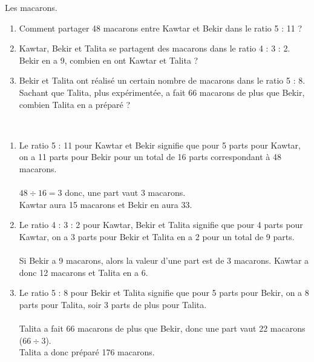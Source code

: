\begin{exercice*}
   Les macarons.
   \begin{enumerate}
      \item Comment partager 48 macarons entre Kawtar et Bekir dans le ratio 5 : 11 ?
      \item Kawtar, Bekir et Talita se partagent des macarons dans le ratio 4 : 3 : 2. Bekir en a 9, combien en ont Kawtar et Talita ?
      \item Bekir et Talita ont réalisé un certain nombre de macarons dans le ratio 5 : 8. Sachant que Talita, plus expérimentée, a fait 66 macarons de plus que Bekir, combien Talita en a préparé ?
   \end{enumerate}
\end{exercice*}
\begin{corrige}
\ \\ [-5mm]
   \begin{enumerate}
      \item Le ratio 5 : 11 pour Kawtar et Bekir signifie que pour 5 parts pour Kawtar, on a 11 parts pour Bekir pour un total de 16 parts correspondant à 48 macarons. \\ [2mm]
            \qquad {} \\
         $48\div16 =3$ donc, une part vaut 3 macarons. \\
         {\color{red} Kawtar aura 15 macarons et Bekir en aura 33.} 
      \item Le ratio 4 : 3 : 2 pour Kawtar, Bekir et Talita signifie que pour 4 parts pour Kawtar, on a 3 parts pour Bekir et Talita en a 2 pour un total de 9 parts. \\ [2mm]
            \quad {} \\
         Si Bekir a 9 macarons, alors la valeur d'une part est de 3 macarons.
         {\color{red} Kawtar a donc 12 macarons et Talita en a 6.} 
      \item Le ratio 5 : 8 pour Bekir et Talita signifie que pour 5 parts pour Bekir, on a 8 parts pour Talita, soir 3 parts de plus pour Talita.\\ [2mm]
            \qquad {} \\
         Talita a fait 66 macarons de plus que Bekir, donc une part vaut 22 macarons ($66\div3$). \\
         {\color{red} Talita a donc préparé 176 macarons.} 
   \end{enumerate}
\end{corrige}
